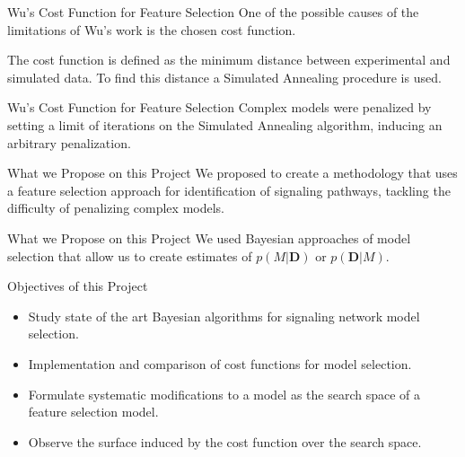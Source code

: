 \documentclass{beamer}
\begin{document}
\begin{frame}{Wu's Cost Function for Feature Selection}
One of the possible causes of the limitations of Wu's work is the chosen
cost function.
\pause

The cost function is defined as the minimum distance between 
experimental and simulated data. To find this distance a Simulated 
Annealing  procedure is used.
\end{frame}

\begin{frame}{Wu's Cost Function for Feature Selection}
Complex models were penalized by setting a limit of iterations on the
Simulated Annealing algorithm, \pause inducing an \alert{arbitrary
penalization}.
\end{frame}


\begin{frame}{What we Propose on this Project}
We proposed to create a methodology that uses a feature selection 
approach for identification of signaling pathways, tackling the 
difficulty of \alert{penalizing complex models}.
\end{frame}

\begin{frame}{What we Propose on this Project}
We used Bayesian approaches of model selection that allow us to
create estimates of $p (M | {\bm D})$ or $p ({\bm D} | M)$.
\end{frame}

\begin{frame}{Objectives of this Project}
\begin{itemize}
\pause
\item{Study state of the art Bayesian algorithms for signaling network
    model selection.}
\pause
\item{Implementation and comparison of cost functions for model
    selection.}
\pause
\item{Formulate systematic modifications to a model as the search space
    of a feature selection model.}
\pause
\item{Observe the surface induced by the cost function over the search
    space.}
\end{itemize}
\end{frame}


\end{document}
